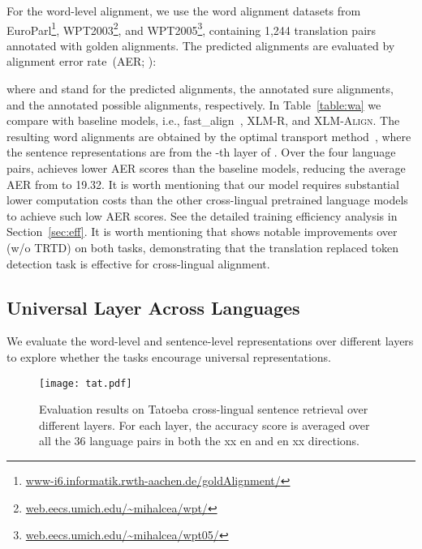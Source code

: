 \documentclass[11pt]{article}
\newcommand\our{\makebox{\textsc{XLM-E}}}
\begin{document}
For the word-level alignment, we use the word alignment datasets from EuroParl\footnote{\url{www-i6.informatik.rwth-aachen.de/goldAlignment/}}, WPT2003\footnote{\url{web.eecs.umich.edu/~mihalcea/wpt/}}, and WPT2005\footnote{\url{web.eecs.umich.edu/~mihalcea/wpt05/}}, containing 1,244 translation pairs annotated with golden alignments. The predicted alignments are evaluated by alignment error rate~(AER; \citealt{och2003systematic}):

where  and  stand for the predicted alignments, the annotated sure alignments, and the annotated possible alignments, respectively.
In Table~\ref{table:wa} we compare \our{} with baseline models, i.e., fast\_align~\cite{fastalign}, XLM-R, and \textsc{XLM-Align}. The resulting word alignments are obtained by the optimal transport method~\cite{xlmalign}, where the sentence representations are from the -th layer of \our{}. Over the four language pairs, \our{} achieves lower AER scores than the baseline models, reducing the average AER from  to 19.32. It is worth mentioning that our model requires substantial lower computation costs than the other cross-lingual pretrained language models to achieve such low AER scores. 
See the detailed training efficiency analysis in Section~\ref{sec:eff}.
It is worth mentioning that \our{} shows notable improvements over \our{} (w/o TRTD) on both tasks, demonstrating that the translation replaced token detection task is effective for cross-lingual alignment.

\subsection{Universal Layer Across Languages}

We evaluate the word-level and sentence-level representations over different layers to explore whether the \our{} tasks encourage universal representations.


\begin{figure}
\centering
\texttt{[image: tat.pdf]}
\caption{Evaluation results on Tatoeba cross-lingual sentence retrieval over different layers. For each layer, the accuracy score is averaged over all the 36 language pairs in both the xx  en and en  xx directions. }
\label{fig:tat}
\end{figure}
\end{document}
